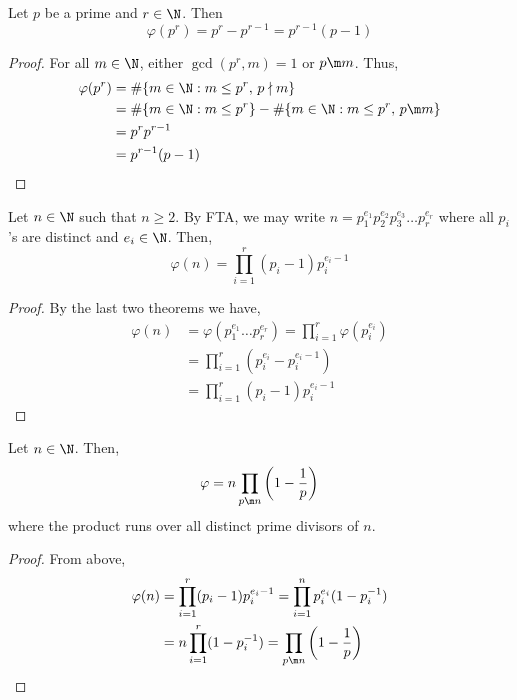 \begin{nthm}
  Let $p$ be a prime and $r \in \N$. Then
  $$ \varphi(p^r) = p^r - p^{r-1} = p^{r-1}(p - 1) $$
\end{nthm}
\begin{proof}
  For all $m \in \N$, either $\gcd(p^r, m) = 1$ or $p \m m$. Thus,
  \begin{align*}
    \varphi(p^r) &= \#\{m\in \N : m \le p^r,\, p \nmid m\}\\
    &= \#\{m \in \N : m \le p^r\} - \#\{m \in \N : m \le p^r,\, p \m m\}\\
    &= p^r p^{r-1}\\
    &= p^{r-1}(p-1)
  \end{align*}
\end{proof}

\begin{nprop}
   Let $n \in \N$ such that $n \ge 2$. By FTA, we may write $n = p_1^{e_1}p_2^{e_2}p_3^{e_3}\dots p_r^{e_r}$ where all $p_i$'s are distinct and $e_i \in \N$. Then,
   $$ \varphi(n) = \prod_{i = 1}^r (p_i - 1)p_i^{e_i - 1} $$
\end{nprop}
\begin{proof}
  By the last two theorems we have,
  \begin{align*}
    \varphi(n) &= \varphi(p_1^{e_1}\dots p_r^{e_r}) = \prod_{i=1}^r \varphi(p_i^{e_i}) \\
    &= \prod_{i=1}^r (p_i^{e_i} - p_i^{e_i-1})\\
    &= \prod_{i=1}^r (p_i-1)p_i^{e_i - 1}
  \end{align*}
\end{proof}

\begin{ncor}
   Let $n \in \N$. Then,
   $$ \varphi = n\prod_{p \m n} \left( 1 - \frac{1}{p} \right) $$
   where the product runs over all distinct prime divisors of $n$.
\end{ncor}
\begin{proof}
  From above,
  \begin{align}
    \varphi(n) &= \prod_{i=1}^r (p_i - 1)p_i^{e_i-1} = \prod_{i=1}^n p_i^{e_i} (1 - p_i^{-1}) \\
    &= n \prod_{i=1}^r (1 - p_i^{-1}) = \prod_{p \m n} \left( 1 - \frac{1}{p} \right)
  \end{align}
\end{proof}

